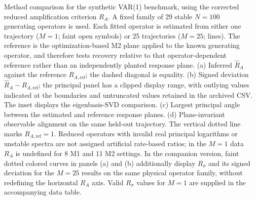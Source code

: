 \caption{Method comparison for the synthetic VAR(1) benchmark, using the corrected reduced amplification criterion $R_A$.
A fixed family of 29 stable $N=100$ generating operators is used. Each fitted operator is estimated from either one trajectory ($M=1$; faint open symbols) or 25 trajectories ($M=25$; lines). The reference is the optimization-based M2 plane applied to the known generating operator, and therefore tests recovery relative to that operator-dependent reference rather than an independently planted response plane.
(a) Inferred $\widehat R_A$ against the reference $R_{A,\mathrm{ref}}$; the dashed diagonal is equality.
(b) Signed deviation $\widehat R_A-R_{A,\mathrm{ref}}$; the principal panel has a clipped display range, with outlying values indicated at the boundaries and untruncated values retained in the archived CSV. The inset displays the eigenbasis-SVD comparison.
(c) Largest principal angle between the estimated and reference response planes.
(d) Plane-invariant observable alignment on the same held-out trajectory.
The vertical dotted line marks $R_{A,\mathrm{ref}}=1$. Reduced operators with invalid real principal logarithms or unstable spectra are not assigned artificial rate-based ratios; in the $M=1$ data $R_A$ is undefined for 8 M1 and 11 M2 settings. In the companion version, faint dotted colored curves in panels (a) and (b) additionally display $R_\sigma$ and its signed deviation for the $M=25$ results on the same physical operator family, without redefining the horizontal $R_A$ axis. Valid $R_\sigma$ values for $M=1$ are supplied in the accompanying data table.}
